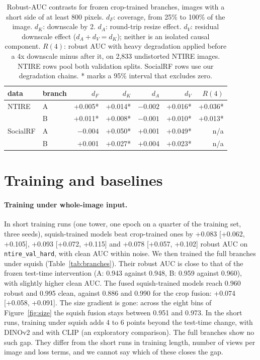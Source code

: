 \documentclass[letterpaper]{article} %
\begin{document}
\begin{table}[t]
\centering
\footnotesize
\setlength{\tabcolsep}{2pt}
\begin{tabular}{llrrrrr}
\toprule
data & branch & $d_F$ & $d_K$ & $d_A$ & $d_V$ & $R(4)$ \\
\midrule
NTIRE & A & +0.005* & +0.014* & $-0.002$ & +0.016* & +0.036* \\
      & B & +0.011* & +0.008* & $-0.001$ & +0.010* & +0.013* \\
SocialRF & A & $-0.004$ & +0.050* & +0.001 & +0.049* & n/a \\
         & B & +0.001 & +0.027* & +0.004 & +0.023* & n/a \\
\bottomrule
\end{tabular}
\caption{Robust-AUC contrasts for frozen crop-trained branches,
images with a short side of at least 800 pixels. $d_F$: coverage, from 25\% to 100\% of the image. $d_K$: downscale by 2.
$d_A$: round-trip resize effect. $d_V$: residual downscale effect
($d_A+d_V=d_K$); neither is an isolated causal component. $R(4)$: robust AUC with heavy degradation applied before
a 4x downscale minus after it, on 2,833 undistorted NTIRE images. NTIRE rows pool both validation splits. SocialRF rows
use our degradation chains. * marks a 95\% interval that excludes zero.}
\label{tab:decomp}
\end{table}



\section{Training and baselines}
\label{sec:training}

\paragraph{Training under whole-image input.} In short training runs (one tower,
one epoch on a quarter of the training set, three seeds), squish-trained
models beat crop-trained ones by +0.083 [+0.062, +0.105], +0.093 [+0.072,
+0.115] and +0.078 [+0.057, +0.102] robust AUC on \texttt{ntire\_val\_hard},
with clean AUC within noise. We then trained the full branches under squish
(Table~\ref{tab:branches}). Their robust AUC is close to that of the frozen test-time intervention (A:
0.943 against 0.948, B: 0.959 against 0.960), with slightly higher clean AUC. The
fused squish-trained models reach 0.960 robust and 0.995 clean, against 0.886
and 0.990 for the crop fusion: +0.074 [+0.058, +0.091]. The size gradient is
gone: across the eight bins of Figure~\ref{fig:size} the squish fusion stays
between 0.951 and 0.973. In the short runs, training under squish adds 4 to 6
points beyond the test-time change, with DINOv2 and with CLIP (an
exploratory comparison). The full branches show no such gap. They
differ from the short runs in training length, number of views per image and
loss terms, and we cannot say which of these closes the gap.
\end{document}
